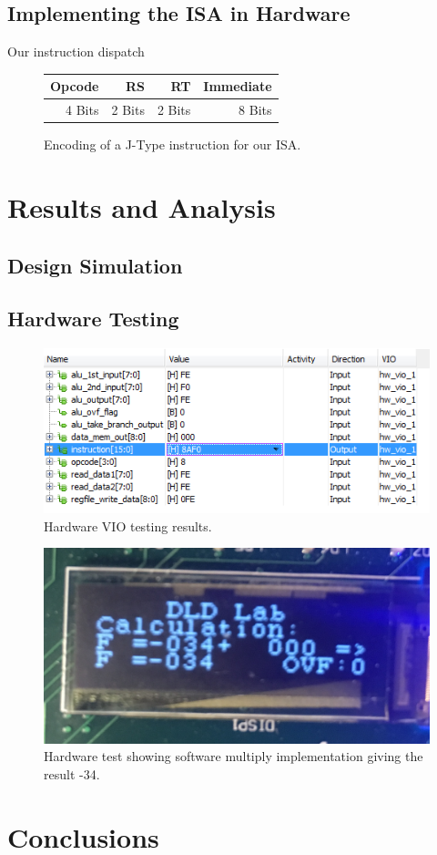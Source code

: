 \documentclass[12pt, letterpaper]{article}
\begin{document}
\subsection{Implementing the ISA in Hardware}
Our instruction dispatch 



\begin{figure}[h]
\centering
\begin{tabular}{|r|r|r|r|}
\hline
Opcode & RS     & RT     & Immediate \\ 
\hline
4 Bits & 2 Bits & 2 Bits & 8 Bits \\ 
\hline
\end{tabular}
\caption{Encoding of a J-Type instruction for our ISA.}
\end{figure}




\newpage
\section{Results and Analysis}

\subsection{Design Simulation}

\subsection{Hardware Testing}
\FloatBarrier

\begin{figure}[h]
\centering
\includegraphics[width=0.8\linewidth]{images/lab8-hardware-test-1.png}
\caption{Hardware VIO testing results.}
\end{figure}

\begin{figure}[h]
\centering
\includegraphics[width=0.8\linewidth]{images/lab8-hardware-test-2.png}
\caption{Hardware test showing software multiply implementation giving the result -34.}
\end{figure}


\FloatBarrier\newpage
\section{Conclusions}


\newpage
\appendix
\appendixpage
\addappheadtotoc 
\end{document}
